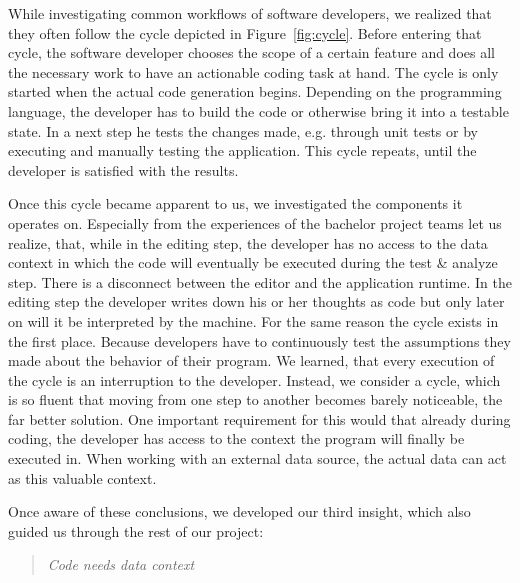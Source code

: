 While investigating common workflows of software developers, we realized that they often follow the cycle depicted in Figure~\ref{fig:cycle}. Before entering that cycle, the software developer chooses the scope of a certain feature and does all the necessary work to have an actionable coding task at hand. The cycle is only started when the actual code generation begins. Depending on the programming language, the developer has to build the code or otherwise bring it into a testable state. In a next step he tests the changes made, e.g. through unit tests or by executing and manually testing the application. This cycle repeats, until the developer is satisfied with the results.

Once this cycle became apparent to us, we investigated the components it operates on. Especially from the experiences of the bachelor project teams let us realize, that, while in the editing step, the developer has no access to the data context in which the code will eventually be executed during the test \& analyze step. There is a disconnect between the editor and the application runtime. In the editing step the developer writes down his or her thoughts as code but only later on will it be interpreted by the machine. For the same reason the cycle exists in the first place. Because developers have to continuously test the assumptions they made about the behavior of their program. We learned, that every execution of the cycle is an interruption to the developer. Instead, we consider a cycle, which is so fluent that moving from one step to another becomes barely noticeable, the far better solution. One important requirement for this would that already during coding, the developer has access to the context the program will finally be executed in. When working with an external data source, the actual data can act as this valuable context.

Once aware of these conclusions, we developed our third insight, which also guided us through the rest of our project:

\begin{quote}
\emph{Code needs data context}
\end{quote}